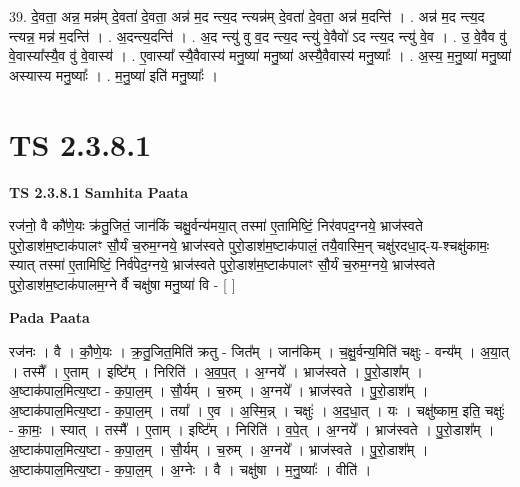 \documentclass[17pt]{extarticle}
\begin{document}
39. दे॒वता॒ अन्न॒ मन्न॑म् दे॒वता॑ दे॒वता॒ अन्न॑ म॒द न्त्य॒द न्त्यन्न॑म् दे॒वता॑ दे॒वता॒ अन्न॑ म॒दन्ति॑ । . अन्न॑ म॒द न्त्य॒द न्त्यन्न॒ मन्न॑ म॒दन्ति॑ । . अ॒दन्त्य॒दन्ति॑ । . अ॒द न्त्यु॑ वु व॒द न्त्य॒द न्त्यु॑ वे॒वैवो॑ ऽद न्त्य॒द न्त्यु॑ वे॒व । . उ॒ वे॒वैव वु॑ वे॒वास्या᳚स्यै॒व वु॑ वे॒वास्य॑ । . ए॒वास्या᳚ स्यै॒वैवास्य॑ मनु॒ष्या॑ मनु॒ष्या॑ अस्यै॒वैवास्य॑ मनु॒ष्याः᳚ । . अ॒स्य॒ म॒नु॒ष्या॑ मनु॒ष्या॑ अस्यास्य मनु॒ष्याः᳚ । . म॒नु॒ष्या॑ इति॑ मनु॒ष्याः᳚ । \newline
\pagebreak
{}
\section*{ TS 2.3.8.1 }

\textbf{TS 2.3.8.1 } \newline
\textbf{Samhita Paata} \newline

रज॑नो॒ वै कौ॑णे॒यः क्र॑तु॒जितं॒ जान॑किं चक्षु॒र्वन्य॑मया॒त् तस्मा॑ ए॒तामिष्टिं॒ निर॑वपद॒ग्नये॒ भ्राज॑स्वते पुरो॒डाश॑म॒ष्टाक॑पालꣳ सौ॒र्यं च॒रुम॒ग्नये॒ भ्राज॑स्वते पुरो॒डाश॑म॒ष्टाक॑पालं॒ तयै॒वास्मि॒न् चक्षु॑रदधा॒द्-य-श्चक्षु॑कामः॒ स्यात् तस्मा॑ ए॒तामिष्टिं॒ निर्व॑पेद॒ग्नये॒ भ्राज॑स्वते पुरो॒डाश॑म॒ष्टाक॑पालꣳ सौ॒र्यं च॒रुम॒ग्नये॒ भ्राज॑स्वते पुरो॒डाश॑म॒ष्टाक॑पालम॒ग्ने र्वै चक्षु॑षा मनु॒ष्या॑ वि - [  ] \newline

\textbf{Pada Paata} \newline

रज॑नः । वै । कौ॒णे॒यः । क्र॒तु॒जित॒मिति॑ क्रतु - जित᳚म् । जान॑किम् । च॒क्षु॒र्वन्य॒मिति॑ चक्षुः - वन्य᳚म् । अ॒या॒त् । तस्मै᳚ । ए॒ताम् । इष्टि᳚म् । निरिति॑ । अ॒व॒प॒त् । अ॒ग्नये᳚ । भ्राज॑स्वते । पु॒रो॒डाश᳚म् । अ॒ष्टाक॑पाल॒मित्य॒ष्टा - क॒पा॒ल॒म् । सौ॒र्यम् । च॒रुम् । अ॒ग्नये᳚ । भ्राज॑स्वते । पु॒रो॒डाश᳚म् । अ॒ष्टाक॑पाल॒मित्य॒ष्टा - क॒पा॒ल॒म् । तया᳚ । ए॒व । अ॒स्मि॒न्न् । चक्षुः॑ । अ॒द॒धा॒त् । यः । चक्षु॑ष्काम॒ इति॒ चक्षुः॑ - का॒मः॒ । स्यात् । तस्मै᳚ । ए॒ताम् । इष्टि᳚म् । निरिति॑ । व॒पे॒त् । अ॒ग्नये᳚ । भ्राज॑स्वते । पु॒रो॒डाश᳚म् । अ॒ष्टाक॑पाल॒मित्य॒ष्टा - क॒पा॒ल॒म् । सौ॒र्यम् । च॒रुम् । अ॒ग्नये᳚ । भ्राज॑स्वते । पु॒रो॒डाश᳚म् । अ॒ष्टाक॑पाल॒मित्य॒ष्टा - क॒पा॒ल॒म् । अ॒ग्नेः । वै । चक्षु॑षा । म॒नु॒ष्याः᳚ । वीति॑ ।  \newline
\end{document}
